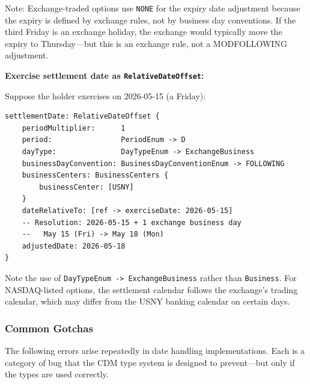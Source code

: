 \documentclass[11pt,a4paper]{article}
\begin{document}
\noindent Note: Exchange-traded options use \texttt{NONE} for the expiry date adjustment because the expiry is defined by exchange rules, not by business day conventions. If the third Friday is an exchange holiday, the exchange would typically move the expiry to Thursday---but this is an exchange rule, not a MODFOLLOWING adjustment.

\smallskip
\noindent\textbf{Exercise settlement date as \texttt{RelativeDateOffset}:}

Suppose the holder exercises on 2026-05-15 (a Friday):

\begin{lstlisting}
settlementDate: RelativeDateOffset {
    periodMultiplier:      1
    period:                PeriodEnum -> D
    dayType:               DayTypeEnum -> ExchangeBusiness
    businessDayConvention: BusinessDayConventionEnum -> FOLLOWING
    businessCenters: BusinessCenters {
        businessCenter: [USNY]
    }
    dateRelativeTo: [ref -> exerciseDate: 2026-05-15]
    -- Resolution: 2026-05-15 + 1 exchange business day
    --   May 15 (Fri) -> May 18 (Mon)
    adjustedDate: 2026-05-18
}
\end{lstlisting}

\noindent Note the use of \texttt{DayTypeEnum -> ExchangeBusiness} rather than \texttt{Business}. For NASDAQ-listed options, the settlement calendar follows the exchange's trading calendar, which may differ from the USNY banking calendar on certain days.

\subsubsection{Common Gotchas}
\label{sec:cdm-date-gotchas}

The following errors arise repeatedly in date handling implementations. Each is a category of bug that the CDM type system is designed to prevent---but only if the types are used correctly.
\end{document}
